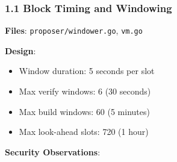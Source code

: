 \documentclass[
]{article}
\providecommand{\tightlist}{%
  \setlength{\itemsep}{0pt}\setlength{\parskip}{0pt}}
\begin{document}
\subsubsection{1.1 Block Timing and
Windowing}\label{11-block-timing-and-windowing}

\textbf{Files}: \texttt{proposer/windower.go}, \texttt{vm.go}

\textbf{Design}:

\begin{itemize}
\tightlist
\item
  Window duration: 5 seconds per slot
\item
  Max verify windows: 6 (30 seconds)
\item
  Max build windows: 60 (5 minutes)
\item
  Max look-ahead slots: 720 (1 hour)
\end{itemize}

\textbf{Security Observations}:
\end{document}
